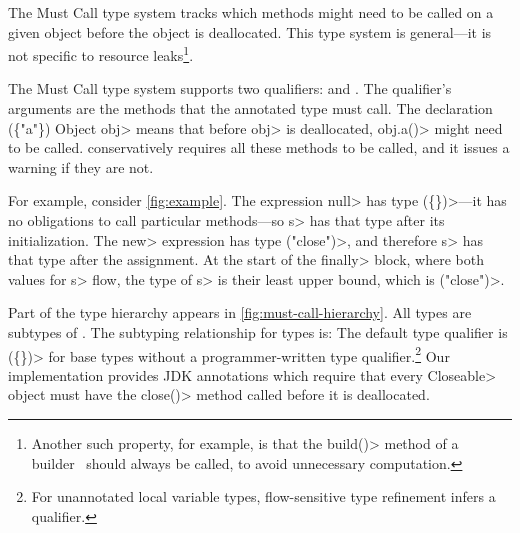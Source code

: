 The Must Call type system tracks which methods might need to be called
on a given object before the object is deallocated.  This type system
is general---it is not specific to resource leaks\footnote{Another such
  property, for example, is that the
  \<build()> method of a builder~\cite{designpatterns} should always
  be called, to avoid unnecessary computation.}.

The Must Call type system supports two qualifiers: \MustCall and
\MustCallUnknown. The \MustCall qualifier's arguments are the
methods that the annotated type must call. The declaration
\MustCall\<(\{"a"\}) Object obj> means that before \<obj> is
deallocated, \<obj.a()> might need to be called.
\Tool conservatively requires all these methods to be called,
and it issues a warning if they are not.

For example, consider \cref{fig:example}. The expression \<null> has type
\MustCall\<(\{\})>---it has no obligations
to call particular methods---so \<s> has that type after its initialization.
The \<new> expression has type \MustCall\<("close")>, and therefore
\<s> has that type after the assignment.
At the start of the \<finally> block, where both values for \<s> flow,
the type of \<s> is their least upper bound, which is \MustCall\<("close")>.


Part of the type hierarchy appears in \cref{fig:must-call-hierarchy}.
All types are subtypes of \MustCallUnknown.
The subtyping relationship for \MustCall types is:
The default type qualifier is \MustCall\<(\{\})> for base types without a
programmer-written type qualifier.\footnote{For unannotated local variable types,
  flow-sensitive type refinement infers a qualifier.}
Our implementation
provides JDK annotations which require that every 
\<Closeable> object must have the \<close()> method called before
it is deallocated.  

